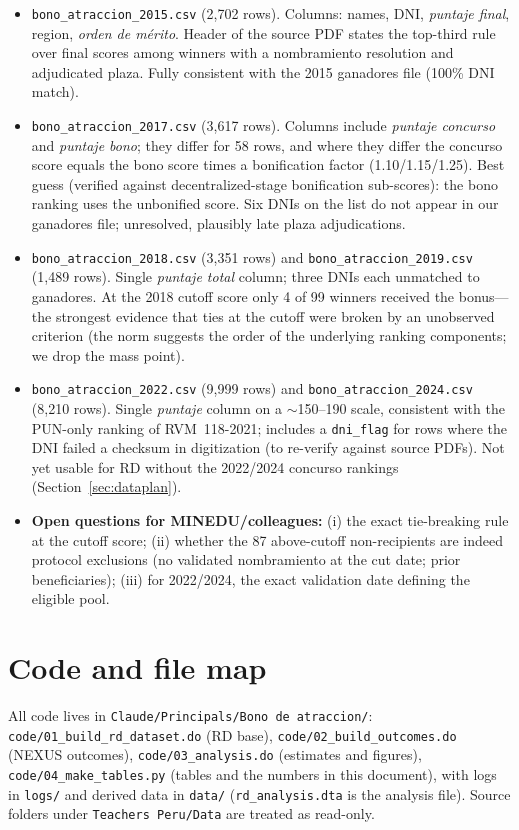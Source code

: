 \documentclass[11pt]{article}
\begin{document}
\begin{itemize}
\item \texttt{bono\_atraccion\_2015.csv} (2,702 rows). Columns: names, DNI,
\emph{puntaje final}, region, \emph{orden de m\'erito}. Header of the source
PDF states the top-third rule over final scores among winners with a
nombramiento resolution and adjudicated plaza. Fully consistent with the
2015 ganadores file (100\% DNI match).
\item \texttt{bono\_atraccion\_2017.csv} (3,617 rows). Columns include
\emph{puntaje concurso} and \emph{puntaje bono}; they differ for 58 rows, and
where they differ the concurso score equals the bono score times a
bonification factor (1.10/1.15/1.25). Best guess (verified against
decentralized-stage bonification sub-scores): the bono ranking uses the
unbonified score. Six DNIs on the list do not appear in our ganadores file;
unresolved, plausibly late plaza adjudications.
\item \texttt{bono\_atraccion\_2018.csv} (3,351 rows) and
\texttt{bono\_atraccion\_2019.csv} (1,489 rows). Single \emph{puntaje total}
column; three DNIs each unmatched to ganadores. At the 2018 cutoff score only
4 of 99 winners received the bonus---the strongest evidence that ties at the
cutoff were broken by an unobserved criterion (the norm suggests the order of
the underlying ranking components; we drop the mass point).
\item \texttt{bono\_atraccion\_2022.csv} (9,999 rows) and
\texttt{bono\_atraccion\_2024.csv} (8,210 rows). Single \emph{puntaje} column
on a $\sim$150--190 scale, consistent with the PUN-only ranking of
RVM~118-2021; includes a \texttt{dni\_flag} for rows where the DNI failed a
checksum in digitization (to re-verify against source PDFs). Not yet usable
for RD without the 2022/2024 concurso rankings (Section~\ref{sec:dataplan}).
\item \textbf{Open questions for MINEDU/colleagues:} (i) the exact
tie-breaking rule at the cutoff score; (ii) whether the 87 above-cutoff
non-recipients are indeed protocol exclusions (no validated nombramiento at
the cut date; prior beneficiaries); (iii) for 2022/2024, the exact validation
date defining the eligible pool.
\end{itemize}

\section{Code and file map}

All code lives in \texttt{Claude/Principals/Bono de atraccion/}:
\texttt{code/01\_build\_rd\_dataset.do} (RD base),
\texttt{code/02\_build\_outcomes.do} (NEXUS outcomes),
\texttt{code/03\_analysis.do} (estimates and figures),
\texttt{code/04\_make\_tables.py} (tables and the numbers in this document),
with logs in \texttt{logs/} and derived data in \texttt{data/}
(\texttt{rd\_analysis.dta} is the analysis file). Source folders under
\texttt{Teachers Peru/Data} are treated as read-only.
\end{document}
